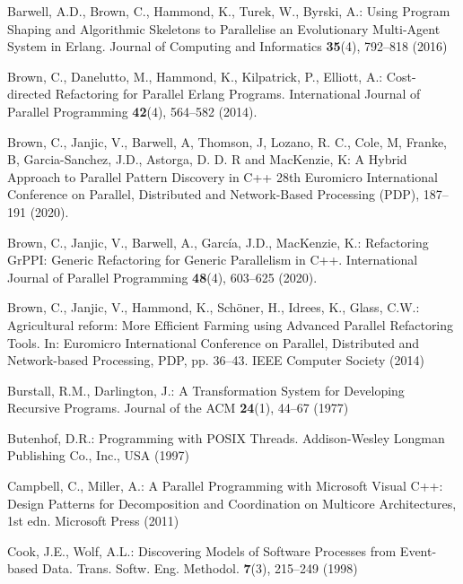 \documentclass[smallextended]{svjour3}
\begin{document}
\begin{thebibliography}{10}
Barwell, A.D., Brown, C., Hammond, K., Turek, W., Byrski, A.: Using Program
  Shaping and Algorithmic Skeletons to Parallelise an Evolutionary Multi-Agent
  System in Erlang.
\newblock Journal of Computing and Informatics \textbf{35}(4), 792--818 (2016)

Brown, C., Danelutto, M., Hammond, K., Kilpatrick, P., Elliott, A.:
  Cost-directed Refactoring for Parallel Erlang Programs.
\newblock International Journal of Parallel Programming \textbf{42}(4),
  564--582 (2014).
  
Brown, C., Janjic, V., Barwell, A, Thomson, J, Lozano, R. C., Cole, M, Franke, B, Garcia-Sanchez, J.D., Astorga, D. D. R and MacKenzie, K:
A Hybrid Approach to Parallel Pattern Discovery in C++
 28th Euromicro International Conference on Parallel, Distributed and Network-Based Processing (PDP), 187--191 (2020).

Brown, C., Janjic, V., Barwell, A., García, J.D., MacKenzie, K.: {Refactoring
  GrPPI: Generic Refactoring for Generic Parallelism in C++}.
\newblock International Journal of Parallel Programming \textbf{48}(4),
  603--625 (2020).
\newblock {}

Brown, C., Janjic, V., Hammond, K., Sch{\"{o}}ner, H., Idrees, K., Glass, C.W.:
  Agricultural reform: More Efficient Farming using Advanced Parallel
  Refactoring Tools.
\newblock In: {Euromicro International Conference on Parallel, Distributed and Network-based Processing, PDP}, pp. 36--43. {IEEE} Computer Society (2014)

Burstall, R.M., Darlington, J.: A Transformation System for Developing
  Recursive Programs.
\newblock Journal of the {ACM} \textbf{24}(1), 44--67 (1977)

Butenhof, D.R.: Programming with POSIX Threads.
\newblock Addison-Wesley Longman Publishing Co., Inc., USA (1997)

Campbell, C., Miller, A.: A Parallel Programming with Microsoft Visual C++:
  Design Patterns for Decomposition and Coordination on Multicore
  Architectures, 1st edn.
\newblock Microsoft Press (2011)

Cook, J.E., Wolf, A.L.: Discovering Models of Software Processes from
  Event-based Data.
 Trans. Softw. Eng. Methodol. \textbf{7}(3), 215--249 (1998)


\end{thebibliography}
\end{document}
